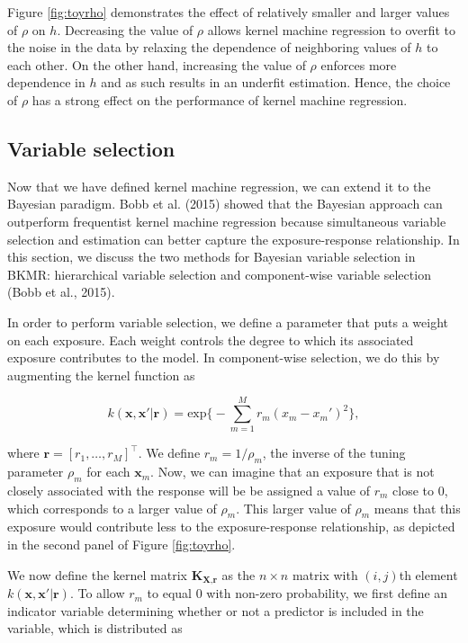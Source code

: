 \documentclass[12pt, twoside]{amherstthesis}
\begin{document}
Figure \ref{fig:toyrho} demonstrates the effect of relatively smaller and larger values of \(\rho\) on \(h\). Decreasing the value of \(\rho\) allows kernel machine regression to overfit to the noise in the data by relaxing the dependence of neighboring values of \(h\) to each other. On the other hand, increasing the value of \(\rho\) enforces more dependence in \(h\) and as such results in an underfit estimation. Hence, the choice of \(\rho\) has a strong effect on the performance of kernel machine regression.

\hypertarget{variable-selection}{%
\subsection{Variable selection}\label{variable-selection}}

Now that we have defined kernel machine regression, we can extend it to the Bayesian paradigm. Bobb et al. (2015) showed that the Bayesian approach can outperform frequentist kernel machine regression because simultaneous variable selection and estimation can better capture the exposure-response relationship. In this section, we discuss the two methods for Bayesian variable selection in BKMR: hierarchical variable selection and component-wise variable selection (Bobb et al., 2015).

In order to perform variable selection, we define a parameter that puts a weight on each exposure. Each weight controls the degree to which its associated exposure contributes to the model. In component-wise selection, we do this by augmenting the kernel function as

\[
k(\textbf{x}, \textbf{x}'|\textbf{r}) = \text{exp}\bigg\{ -\sum_{m=1}^Mr_m(x_m-x_m')^2 \bigg\},
\]

\noindent where \(\textbf{r}=[r_1,\dots,r_M]^\top\). We define \(r_m=1/{\rho_m}\), the inverse of the tuning parameter \(\rho_m\) for each \(\textbf{x}_m\). Now, we can imagine that an exposure that is not closely associated with the response will be be assigned a value of \(r_m\) close to 0, which corresponds to a larger value of \(\rho_m\). This larger value of \(\rho_m\) means that this exposure would contribute less to the exposure-response relationship, as depicted in the second panel of Figure \ref{fig:toyrho}.

We now define the kernel matrix \(\textbf{K}_{\textbf{X},\textbf{r}}\) as the \(n\times n\) matrix with \((i,j)\)th element \(k(\textbf{x}, \textbf{x}'|\textbf{r})\). To allow \(r_m\) to equal 0 with non-zero probability, we first define an indicator variable determining whether or not a predictor is included in the variable, which is distributed as
\end{document}
